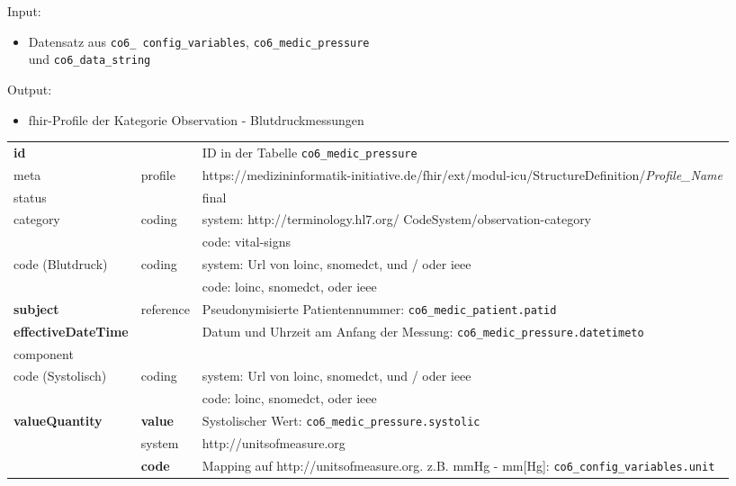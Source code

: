 \noindent Input:
\begin{itemize}
	\item Datensatz aus \texttt{co6\_ config\_variables}, \texttt{co6\_medic\_pressure} \\ und \texttt{co6\_data\_string}
\end{itemize}
Output:
\begin{itemize}
	\item \ac{fhir}-Profile der Kategorie \glqq Observation\grqq{} - Blutdruckmessungen
\end{itemize}
\begin{longtable}{|l|l|p{7cm}|} 
	\hline
	\rowcolor{lightgray} \multicolumn{3}{|l|}{Data Mapping (inhaltlich) - Blutdruckmessungen} \\ \hline
	\textbf{id} &  & ID in der Tabelle \texttt{co6\_medic\_pressure}  \\ \hline
	meta & profile & https://medizininformatik-initiative.de/fhir/ext/modul-icu/StructureDefinition/\textsl{Profile\_Name} \\ \hline 
	status &  & final  \\ \hline 
	category & coding & system: http://terminology.hl7.org/ CodeSystem/observation-category \\ 
	\cline{3-3}
	& & code: vital-signs \\ \hline
	code (Blutdruck) & coding & system: Url von \ac{loinc}, \ac{snomedct}, und / oder \ac{ieee} \\ 
	\cline{3-3} 
	&  & code: \ac{loinc}, \ac{snomedct}, oder \ac{ieee} \\ \hline
	\textbf{subject} & reference & Pseudonymisierte Patientennummer: \texttt{co6\_medic\_patient.patid} \\ \hline
	\textbf{effectiveDateTime} & & Datum und Uhrzeit am Anfang der Messung:  \texttt{co6\_medic\_pressure.datetimeto} \\ \hline
	\multicolumn{3}{|l|}{component} \\ \hline
	code (Systolisch)  & coding & system: Url von \ac{loinc}, \ac{snomedct}, und / oder \ac{ieee} \\ 
	\cline{3-3} 
	&  & code: \ac{loinc}, \ac{snomedct}, oder \ac{ieee} \\ \hline	
	\textbf{valueQuantity} & \textbf{value} & Systolischer Wert: \texttt{co6\_medic\_pressure.systolic} \\
	\cline{2-3}
	& system & http://unitsofmeasure.org \\ 
	\cline{2-3}
	& \textbf{code} & Mapping auf http://unitsofmeasure.org. z.B. mmHg - mm[Hg]: \texttt{co6\_config\_variables.unit} \\ \hline

\end{longtable}
